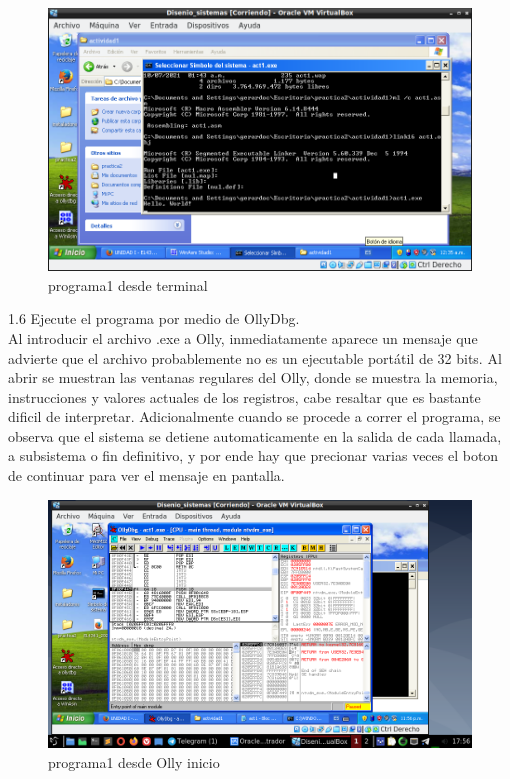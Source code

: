 \begin{figure}[H]
  \includegraphics[width=\linewidth]{practica2/imagenes/ej1/ej1terminal.png}
  \caption{programa1 desde terminal}
\end{figure}




\large{1.6} Ejecute el programa por medio de OllyDbg. \\

Al introducir el archivo .exe a Olly, inmediatamente aparece un mensaje que advierte que el
archivo probablemente no es un ejecutable portátil de 32 bits.
Al abrir se muestran las ventanas regulares del Olly, donde se muestra la memoria, instrucciones y valores actuales de los registros, cabe resaltar que es bastante dificil de interpretar. Adicionalmente cuando se procede a correr el programa, se observa que el sistema se detiene automaticamente en la salida de cada llamada, a subsistema o fin definitivo, y por ende hay que precionar varias veces el boton de continuar para ver el mensaje en pantalla.

\begin{figure}[H]
  \includegraphics[width=\linewidth]{practica2/imagenes/ej1/olly2.png}
  \caption{programa1 desde Olly inicio}
\end{figure}

